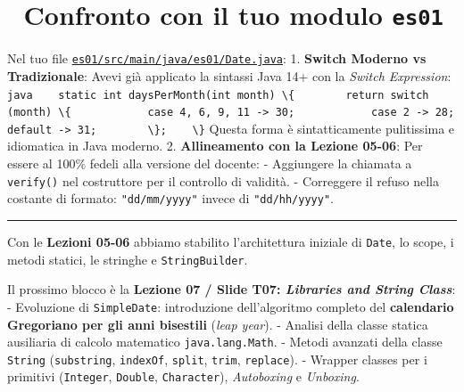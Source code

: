\documentclass[11pt,a4paper,oneside]{report}
\newcommand{\passthrough}[1]{#1}
\begin{document}
\section{\texorpdfstring{🔄 Confronto con il tuo modulo
\texttt{es01}}{🔄 Confronto con il tuo modulo es01}}\label{chap05_confronto-con-il-tuo-modulo-es01}

Nel tuo file
\href{file:///home/wally/Documenti/GitHub/Programmazione-II/25-26/esercizi-wally-25-26/es01/src/main/java/es01/Date.java}{\passthrough{\lstinline!es01/src/main/java/es01/Date.java!}}:
1. \textbf{Switch Moderno vs Tradizionale}: Avevi già applicato la
sintassi Java 14+ con la \emph{Switch Expression}:
\passthrough{\lstinline!java    static int daysPerMonth(int month) \{        return switch (month) \{            case 4, 6, 9, 11 -> 30;            case 2 -> 28;            default -> 31;        \};    \}!}
Questa forma è sintatticamente pulitissima e idiomatica in Java moderno.
2. \textbf{Allineamento con la Lezione 05-06}: Per essere al 100\%
fedeli alla versione del docente: - Aggiungere la chiamata a
\passthrough{\lstinline!verify()!} nel costruttore per il controllo di
validità. - Correggere il refuso nella costante di formato:
\passthrough{\lstinline!"dd/mm/yyyy"!} invece di
\passthrough{\lstinline!"dd/hh/yyyy"!}.

\begin{center}\rule{0.5\linewidth}{0.5pt}\end{center}

\begin{studynote} Con le \textbf{Lezioni 05-06} abbiamo stabilito
l'architettura iniziale di \passthrough{\lstinline!Date!}, lo scope, i
metodi statici, le stringhe e \passthrough{\lstinline!StringBuilder!}.

Il prossimo blocco è la \textbf{Lezione 07 / Slide T07: \emph{Libraries
and String Class}}: - Evoluzione di
\passthrough{\lstinline!SimpleDate!}: introduzione dell'algoritmo
completo del \textbf{calendario Gregoriano per gli anni bisestili}
(\emph{leap year}). - Analisi della classe statica ausiliaria di calcolo
matematico \passthrough{\lstinline!java.lang.Math!}. - Metodi avanzati
della classe \passthrough{\lstinline!String!}
(\passthrough{\lstinline!substring!}, \passthrough{\lstinline!indexOf!},
\passthrough{\lstinline!split!}, \passthrough{\lstinline!trim!},
\passthrough{\lstinline!replace!}). - Wrapper classes per i primitivi
(\passthrough{\lstinline!Integer!}, \passthrough{\lstinline!Double!},
\passthrough{\lstinline!Character!}), \emph{Autoboxing} e
\emph{Unboxing}.
\end{studynote}
\end{document}
